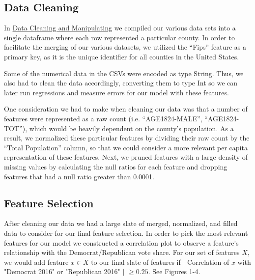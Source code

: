 \documentclass[letterpaper, twocolumn]{article}
\begin{document}
\subsection{Data Cleaning}

In \href{https://tinyurl.com/y2f33unc}{Data Cleaning and Manipulating} we compiled our various data sets into a single dataframe where each row represented a particular county. In order to facilitate the merging of our various datasets, we utilized the “Fips” feature as a primary key, as it is the unique identifier for all counties in the United States.

Some of the numerical data in the CSVs were encoded as type String. Thus, we also had to clean the data accordingly, converting them to type Int so we can later run regressions and measure errors for our model with these features.

One consideration we had to make when cleaning our data was that a number of features were represented as a raw count (i.e. “AGE1824-MALE”, “AGE1824-TOT”), which would be heavily dependent on the county’s population. As a result, we normalized these particular features by dividing their raw count by the “Total Population” column, so that we could consider a more relevant per capita representation of these features. Next, we pruned features with a large density of missing values by calculating the null ratios for each feature and dropping features that had a null ratio greater than 0.0001.


\subsection{Feature Selection}

After cleaning our data we had a large slate of merged, normalized, and filled data to consider for our final feature selection. In order to pick the most relevant features for our model we constructed a correlation plot to observe a feature’s relationship with the  Democrat/Republican vote share. For our set of features \begin{math} X \end{math}, we would add feature \begin{math} x \in X \end{math} to our final slate of features if $\mid$ Correlation of \begin{math} x \end{math} with "Democrat 2016" or "Republican 2016" $\mid$ \begin{math} \geq 0.25 \end{math}. See Figures 1-4.
\end{document}
